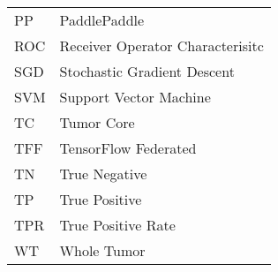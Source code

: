 \begin{table}[H]
\begin{tabular}{p{4cm} p{10cm}}
     PP     & PaddlePaddle \\
     ROC    & Receiver Operator Characterisitc \\
     SGD    & Stochastic Gradient Descent \\
     SVM    & Support Vector Machine \\
     TC     & Tumor Core \\
     TFF    & TensorFlow Federated \\
     TN     & True Negative \\
     TP     & True Positive \\
     TPR    & True Positive Rate \\
     WT     & Whole Tumor
    \end{tabular}%
\end{table}%
